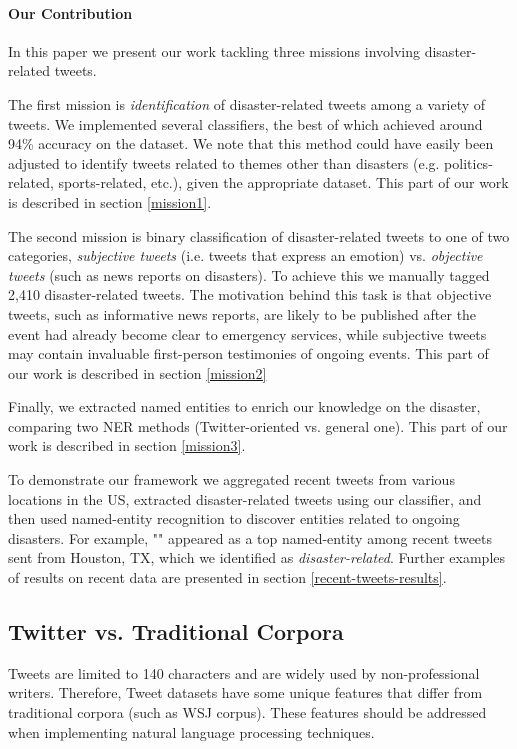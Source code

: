 \documentclass[letterpaper,twocolumn,10pt]{article}
\begin{document}
\paragraph{Our Contribution}

In this paper we present our work tackling three missions involving disaster-related tweets.

The first mission is \textit{identification} of disaster-related tweets among a variety of tweets. We implemented several classifiers, the best of which achieved around 94\% accuracy on the dataset. We note that this method could have easily been adjusted to identify tweets related to themes other than disasters (e.g. politics-related, sports-related, etc.), given the appropriate dataset. This part of our work is described in section \ref{mission1}.

The second mission is binary classification of disaster-related tweets to one of two categories, \textit{subjective tweets} (i.e. tweets that express an emotion) vs. \textit{objective tweets} (such as news reports on disasters). To achieve this we manually tagged 2,410 disaster-related tweets. The motivation behind this task is that objective tweets, such as informative news reports, are likely to be published after the event had already become clear to emergency services, while subjective tweets may contain invaluable first-person testimonies of ongoing events. This part of our work is described in section \ref{mission2}

Finally, we extracted named entities to enrich our knowledge on the disaster, comparing two NER methods (Twitter-oriented vs. general one). This part of our work is described in section \ref{mission3}.

To demonstrate our framework we aggregated recent tweets from various locations in the US, extracted disaster-related tweets using our classifier, and then used named-entity recognition to discover entities related to ongoing disasters. For example, "" appeared as a top named-entity among recent tweets sent from Houston, TX, which we identified as \textit{disaster-related}. Further examples of results on recent data are presented in section \ref{recent-tweets-results}.

\subsection{Twitter vs. Traditional Corpora}

Tweets are limited to 140 characters and are widely used by non-professional writers. Therefore, Tweet datasets have some unique features that differ from traditional corpora (such as WSJ corpus). These features should be addressed when implementing natural language processing techniques.
\end{document}
